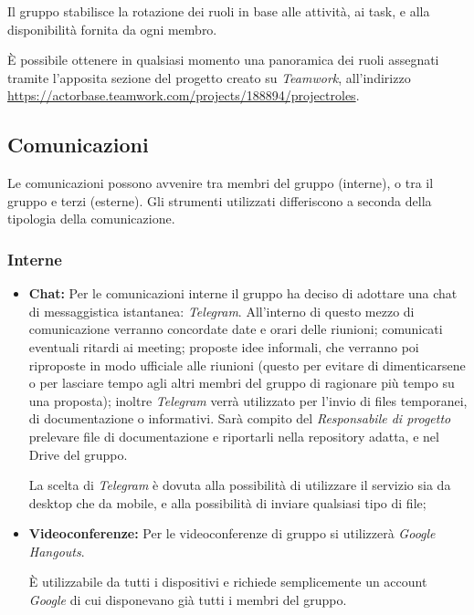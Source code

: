 \documentclass[a4paper]{report}
\begin{document}
		Il gruppo stabilisce la rotazione dei ruoli in base alle attività, ai task, e alla disponibilità fornita da ogni membro.
		
		È possibile ottenere in qualsiasi momento una panoramica dei ruoli assegnati tramite l'apposita sezione del 
		progetto creato su \emph{Teamwork}, all'indirizzo\\ \url{https://actorbase.teamwork.com/projects/188894/projectroles}.
	\subsection{Comunicazioni}
	Le comunicazioni possono avvenire tra membri del gruppo (interne), o tra il gruppo e terzi (esterne). Gli
	strumenti utilizzati differiscono a seconda della tipologia della comunicazione. 
	\subsubsection{Interne}
	\begin{itemize}
		\item \textbf{Chat:} Per le comunicazioni interne il gruppo ha deciso di adottare una chat di messaggistica 
		istantanea: \emph{Telegram}. All'interno di questo mezzo di comunicazione verranno concordate date e orari 
		delle riunioni; comunicati eventuali ritardi ai meeting; proposte idee informali, che verranno poi riproposte 
		in modo ufficiale alle riunioni (questo per evitare di dimenticarsene o per lasciare tempo agli altri membri 
		del gruppo di ragionare più tempo su una proposta); inoltre \emph{Telegram} verrà utilizzato per l'invio di files
		temporanei, di documentazione o informativi. Sarà compito del \emph{Responsabile di progetto} prelevare file di documentazione 
		e riportarli nella repository adatta, e nel Drive del gruppo.
		
		La scelta di \emph{Telegram} è dovuta alla possibilità di utilizzare il servizio sia da desktop che da mobile, e alla 
		possibilità di inviare qualsiasi tipo di file;
		\item \textbf{Videoconferenze:} Per le videoconferenze di gruppo si utilizzerà \emph{Google Hangouts}.
		
		È utilizzabile da tutti i dispositivi e richiede semplicemente un account \emph{Google} di cui disponevano 
		già tutti i membri del gruppo.
	\end{itemize}
\end{document}
